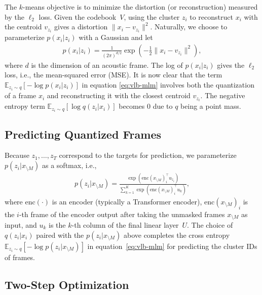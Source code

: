 \documentclass[11pt,a4paper]{article}
\begin{document}
The $k$-means objective is to minimize the distortion (or reconstruction) measured by the $\ell_2$ loss.
Given the codebook~$V$, using the cluster $z_i$ to reconstruct $x_i$ with the centroid $v_{z_i}$ gives a distortion $\|x_i - v_{z_i}\|^2$.
Naturally, we choose to parameterize $p(x_i|z_i)$ with a Gaussian and let
\begin{align}
p(x_i|z_i) = \frac{1}{(2\pi)^{d/2}}\exp\left(-\frac{1}{2}\|x_{i} - v_{z_{i}}\|^2\right),
\label{eq:rec}
\end{align}
where $d$ is the dimension of an acoustic frame.
The log of $p(x_i | z_i)$ gives the $\ell_2$ loss, i.e., the mean-squared error (MSE).
It is now clear that the term $\mathbb{E}_{z_i \sim q}[-\log p(x_i | z_i)]$ in equation \ref{eq:vlb-mlm} involves both the quantization of a frame $x_i$ and reconstructing it with the closest centroid $v_{z_i}$.
The negative entropy term $\mathbb{E}_{z_i \sim q}[\log q(z_i|x_i)]$ becomes 0 due to $q$ being a point mass.

\subsection{Predicting Quantized Frames}

Because $z_1, \dots, z_T$ correspond to the targets for prediction, we parameterize $p(z_i|x_{\setminus M})$
as a softmax, i.e.,
\begin{align}
p(z_i|x_{\setminus M}) = 
  \frac{\exp\left(\mathrm{enc}(x_{\setminus M})_i^\top u_{z_{i}}\right)}
    {\sum_{k=1}^K \exp\left(\mathrm{enc}(x_{\setminus M})_i^\top u_k\right)},
\label{eq:prior}
\end{align}
where $\mathrm{enc}(\cdot)$ is an encoder (typically a Transformer encoder),
%
$\mathrm{enc}(x_{\setminus M})_i$ is the $i$-th frame of the encoder output after taking the unmasked frames $x_{\setminus M}$ as input, and $u_k$ is the $k$-th column of the final linear layer~$U$.
The choice of $q(z_i|x_i)$ paired with the $p(z_i | x_{\setminus M})$ above completes the cross entropy $\mathbb{E}_{z_i \sim q}[-\log p(z_i | x_{\setminus M})]$ in equation~\ref{eq:vlb-mlm} for predicting the cluster IDs of frames.

\subsection{Two-Step Optimization}
\label{sec:optimization}
\end{document}
